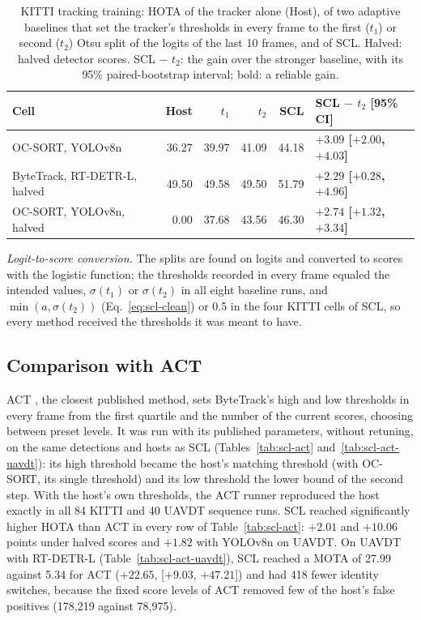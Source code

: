 \begin{table}[tbp]
\centering
\caption{KITTI tracking training: HOTA of the tracker alone (Host), of two adaptive baselines that set the tracker's thresholds in every frame to the first ($t_1$) or second ($t_2$) Otsu split of the logits of the last 10 frames, and of SCL. Halved: halved detector scores. SCL $-$ $t_2$: the gain over the stronger baseline, with its 95\% paired-bootstrap interval; bold: a reliable gain.}
\label{tab:scl-baselines}
\small\setlength{\tabcolsep}{4pt}
\begin{tabular}{lrrrrl}
\toprule
Cell & Host & $t_1$ & $t_2$ & SCL & SCL $-$ $t_2$ [95\% CI]\\
\midrule
OC-SORT, YOLOv8n & 36.27 & 39.97 & 41.09 & 44.18 & \textbf{$+3.09$ [$+2.00$, $+4.03$]}\\
ByteTrack, RT-DETR-L, halved & 49.50 & 49.58 & 49.50 & 51.79 & \textbf{$+2.29$ [$+0.28$, $+4.96$]}\\
OC-SORT, YOLOv8n, halved & 0.00 & 37.68 & 43.56 & 46.30 & \textbf{$+2.74$ [$+1.32$, $+3.34$]}\\
\bottomrule
\end{tabular}
\end{table}

\emph{Logit-to-score conversion.} The splits are found on logits and converted to scores with the logistic function; the thresholds recorded in every frame equaled the intended values, $\sigma(t_1)$ or $\sigma(t_2)$ in all eight baseline runs, and $\min(a,\sigma(t_2))$ (Eq.~\eqref{eq:scl-clean}) or 0.5 in the four KITTI cells of SCL, so every method received the thresholds it was meant to have.

\subsection{Comparison with ACT}\label{sec:scl-act}
ACT \cite{act2026adaptive}, the closest published method, sets ByteTrack's high and low thresholds in every frame from the first quartile and the number of the current scores, choosing between preset levels. It was run with its published parameters, without retuning, on the same detections and hosts as SCL (Tables~\ref{tab:scl-act} and~\ref{tab:scl-act-uavdt}): its high threshold became the host's matching threshold (with OC-SORT, its single threshold) and its low threshold the lower bound of the second step. With the host's own thresholds, the ACT runner reproduced the host exactly in all 84 KITTI and 40 UAVDT sequence runs. SCL reached significantly higher HOTA than ACT in every row of Table~\ref{tab:scl-act}: $+2.01$ and $+10.06$ points under halved scores and $+1.82$ with YOLOv8n on UAVDT. On UAVDT with RT-DETR-L (Table~\ref{tab:scl-act-uavdt}), SCL reached a MOTA of 27.99 against 5.34 for ACT ($+22.65$, [$+9.03$, $+47.21$]) and had 418 fewer identity switches, because the fixed score levels of ACT removed few of the host's false positives (178,219 against 78,975).

